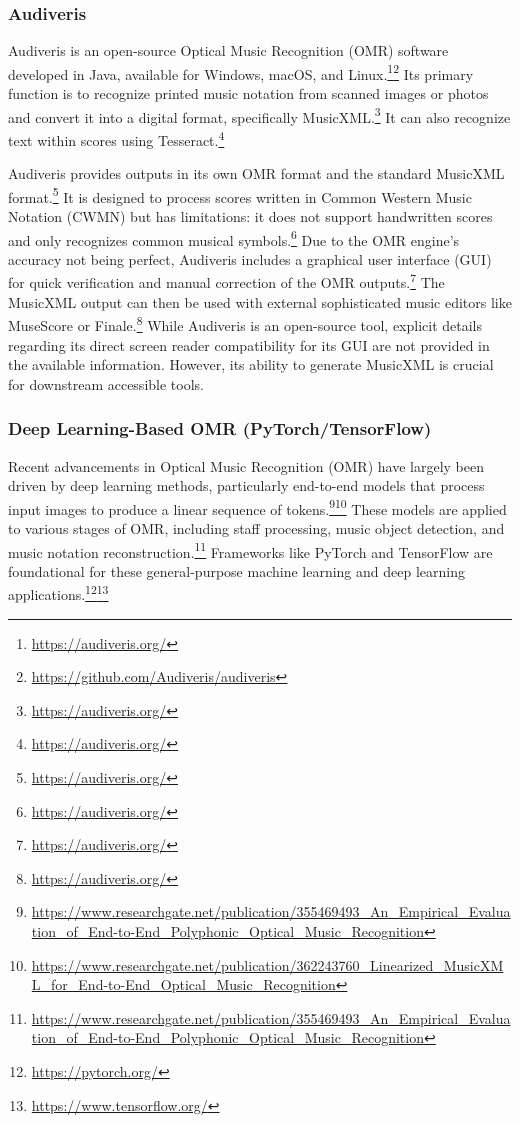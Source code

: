 \subsubsection{Audiveris}
Audiveris is an open-source Optical Music Recognition (OMR) software developed in Java, available for Windows, macOS, and Linux.\footnote{\url{https://audiveris.org/}}\footnote{\url{https://github.com/Audiveris/audiveris}} Its primary function is to recognize printed music notation from scanned images or photos and convert it into a digital format, specifically MusicXML.\footnote{\url{https://audiveris.org/}} It can also recognize text within scores using Tesseract.\footnote{\url{https://audiveris.org/}}

Audiveris provides outputs in its own OMR format and the standard MusicXML format.\footnote{\url{https://audiveris.org/}} It is designed to process scores written in Common Western Music Notation (CWMN) but has limitations: it does not support handwritten scores and only recognizes common musical symbols.\footnote{\url{https://audiveris.org/}} Due to the OMR engine's accuracy not being perfect, Audiveris includes a graphical user interface (GUI) for quick verification and manual correction of the OMR outputs.\footnote{\url{https://audiveris.org/}} The MusicXML output can then be used with external sophisticated music editors like MuseScore or Finale.\footnote{\url{https://audiveris.org/}} While Audiveris is an open-source tool, explicit details regarding its direct screen reader compatibility for its GUI are not provided in the available information. However, its ability to generate MusicXML is crucial for downstream accessible tools.

\subsubsection{Deep Learning-Based OMR (PyTorch/TensorFlow)}
Recent advancements in Optical Music Recognition (OMR) have largely been driven by deep learning methods, particularly end-to-end models that process input images to produce a linear sequence of tokens.\footnote{\url{https://www.researchgate.net/publication/355469493_An_Empirical_Evaluation_of_End-to-End_Polyphonic_Optical_Music_Recognition}}\footnote{\url{https://www.researchgate.net/publication/362243760_Linearized_MusicXML_for_End-to-End_Optical_Music_Recognition}} These models are applied to various stages of OMR, including staff processing, music object detection, and music notation reconstruction.\footnote{\url{https://www.researchgate.net/publication/355469493_An_Empirical_Evaluation_of_End-to-End_Polyphonic_Optical_Music_Recognition}} Frameworks like PyTorch and TensorFlow are foundational for these general-purpose machine learning and deep learning applications.\footnote{\url{https://pytorch.org/}}\footnote{\url{https://www.tensorflow.org/}}

